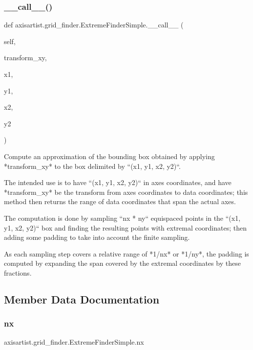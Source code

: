\subsubsection{\texorpdfstring{\+\_\+\+\_\+call\+\_\+\+\_\+()}{\_\_call\_\_()}}
{\footnotesize\ttfamily def axisartist.\+grid\+\_\+finder.\+Extreme\+Finder\+Simple.\+\_\+\+\_\+call\+\_\+\+\_\+ (\begin{DoxyParamCaption}\item[{}]{self,  }\item[{}]{transform\+\_\+xy,  }\item[{}]{x1,  }\item[{}]{y1,  }\item[{}]{x2,  }\item[{}]{y2 }\end{DoxyParamCaption})}

\begin{DoxyVerb}Compute an approximation of the bounding box obtained by applying
*transform_xy* to the box delimited by ``(x1, y1, x2, y2)``.

The intended use is to have ``(x1, y1, x2, y2)`` in axes coordinates,
and have *transform_xy* be the transform from axes coordinates to data
coordinates; this method then returns the range of data coordinates
that span the actual axes.

The computation is done by sampling ``nx * ny`` equispaced points in
the ``(x1, y1, x2, y2)`` box and finding the resulting points with
extremal coordinates; then adding some padding to take into account the
finite sampling.

As each sampling step covers a relative range of *1/nx* or *1/ny*,
the padding is computed by expanding the span covered by the extremal
coordinates by these fractions.
\end{DoxyVerb}
 

\subsection{Member Data Documentation}
\mbox{\label{classaxisartist_1_1grid__finder_1_1ExtremeFinderSimple_a21a6f0268aaa5ad8b14f0b9d153c5609}} 
\subsubsection{\texorpdfstring{nx}{nx}}
{\footnotesize\ttfamily axisartist.\+grid\+\_\+finder.\+Extreme\+Finder\+Simple.\+nx}

